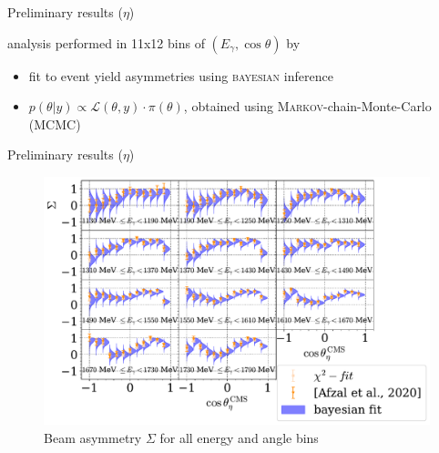 \documentclass[11pt,aspectratio=169,dvipsnames]{beamer}
\newcommand{\thecolor}{black!70!blue}
\begin{document}
\begin{frame}{Preliminary results ($\eta$)}
	\begin{minipage}{\linewidth}
\begin{tcolorbox}[colback=blue!5,colframe=\thecolor,title={Event selection ($\eta$)}]
	analysis performed in 11x12 bins of $(E_\gamma,\cos\theta)$ by \cites{eta}
\end{tcolorbox}
	\end{minipage}
	\begin{minipage}{\linewidth}
\begin{tcolorbox}[colback=blue!5,colframe=\thecolor,title={Method}]
	\begin{itemize}
		\item fit to event yield asymmetries using \textsc{bayesian} inference
		\item $p(\theta|y)\propto\mathcal{L}(\theta,y)\cdot\pi(\theta)$, obtained using \textsc{Markov}-chain-Monte-Carlo (MCMC)
	\end{itemize}
\end{tcolorbox}
	\end{minipage}
	

\end{frame}
\begin{frame}{Preliminary results ($\eta$)}
	\begin{figure}
		\centering
		\includegraphics[width=.8\linewidth]{../bayes/realdeal/sigma_eta_alt.pdf}
		\caption*{Beam asymmetry $\Sigma$ for all energy and angle bins}
	\end{figure}
\end{frame}
\end{document}
